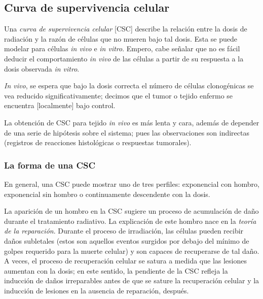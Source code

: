 \documentclass[12pt,letterpaper, oneside]{book}
\begin{document}
			\subsection{Curva de supervivencia celular} %
			Una \textit{curva de supervivencia celular} [CSC] describe la relación entre la dosis de radiación y la razón de células que no mueren bajo tal dosis\cite{Hall.2000, Tubiana.1990}. Esta se puede modelar para células \textit{in vivo} e \textit{in vitro}. Empero, cabe señalar que no es fácil deducir el comportamiento \textit{in vivo} de las células a partir de su respuesta a la dosis observada \textit{in vitro}\cite{Tubiana.1990}. 
			
			\textit{In vivo}, se espera que bajo la dosis correcta el número de células clonogénicas se vea reducido significativamente; decimos que el tumor o tejido enfermo se encuentra [localmente] bajo control\cite{Tubiana.1990}. 
			
			La obtención de CSC para tejido \textit{in vivo} es más lenta y cara, además de depender de una serie de hipótesis sobre el sistema; pues las observaciones son indirectas (registros de reacciones histológicas o respuestas tumorales)\cite{Tubiana.1990}.
			
				\subsubsection{La forma de una CSC}
				En general, una CSC puede mostrar uno de tres perfiles: exponencial con hombro, exponencial sin hombro o continuamente descendente con la dosis\cite{Bleehen.2007}. 
				
				La aparición de un hombro en la CSC sugiere un proceso de acumulación de daño durante el tratamiento radiativo\cite{Bleehen.2007}. La explicación de este hombro nace en la \textit{teoría de la reparación}. Durante el proceso de irradiación, las células pueden recibir daños subletales (estos son aquellos eventos surgidos por debajo del mínimo de golpes requerido para la muerte celular) y son capaces de recuperarse de tal daño\cite{Bleehen.2007}. A veces, el proceso de recuperación celular se satura a medida que las lesiones aumentan con la dosis; en este sentido, la pendiente de la CSC refleja la inducción de daños irreparables antes de que se sature la recuperación celular y la inducción de lesiones en la ausencia de reparación, después\cite{Bleehen.2007}. 
				
\end{document}
